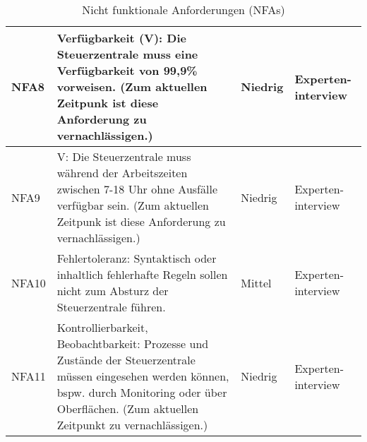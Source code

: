 \begin{table}[hbt!]
\begin{center}
\begin{tabular}{ | p{1.0cm} | p{9.7cm} | p{1.6cm} | p{2.6cm} | }
            \hline
                NFA8 & Verfügbarkeit (V): Die Steuerzentrale muss eine Verfügbarkeit von 99,9\% vorweisen. (Zum aktuellen Zeitpunk ist diese Anforderung zu vernachlässigen.) & Niedrig & Experten-interview \\ 
            \hline
                NFA9 & V: Die Steuerzentrale muss während der Arbeitszeiten zwischen 7-18 Uhr ohne Ausfälle verfügbar sein. (Zum aktuellen Zeitpunk ist diese Anforderung zu vernachlässigen.) & Niedrig & Experten-interview \\ 
            \hline
                NFA10 & Fehlertoleranz: Syntaktisch oder inhaltlich fehlerhafte Regeln sollen nicht zum Absturz der Steuerzentrale führen. & Mittel & Experten-interview \\ 
            \hline  
                NFA11 & Kontrollierbarkeit, Beobachtbarkeit: Prozesse und Zustände der Steuerzentrale müssen eingesehen werden können, bspw. durch Monitoring oder über Oberflächen. (Zum aktuellen Zeitpunkt zu vernachlässigen.) & Niedrig & Experten-interview \\
            \hline
        \end{tabular}
    \end{center}
    \caption{Nicht funktionale Anforderungen (NFAs)}
    \label{tab:notfunctionalRequirements}
\end{table}